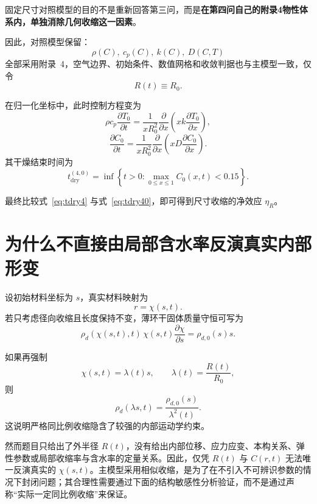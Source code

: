 \documentclass[UTF8,a4paper,12pt]{ctexart}
\begin{document}
固定尺寸对照模型的目的不是重新回答第三问，而是\textbf{在第四问自己的附录4物性体系内，单独消除几何收缩这一因素}。

因此，对照模型保留：
\[
\rho(C),\ c_p(C),\ k(C),\ D(C,T)
\]
全部采用附录~4，空气边界、初始条件、数值网格和收敛判据也与主模型一致，仅令
\begin{equation}
R(t)\equiv R_0.
\label{eq:Rfixed}
\end{equation}

在归一化坐标中，此时控制方程变为
\begin{equation}
\rho c_p\frac{\partial T_0}{\partial t}
=
\frac{1}{xR_0^2}
\frac{\partial}{\partial x}
\left(
 xk\frac{\partial T_0}{\partial x}
\right),
\end{equation}
\begin{equation}
\frac{\partial C_0}{\partial t}
=
\frac{1}{xR_0^2}
\frac{\partial}{\partial x}
\left(
 xD\frac{\partial C_0}{\partial x}
\right).
\end{equation}
其干燥结束时间为
\begin{equation}
\boxed{
t_{\mathrm{dry}}^{(4,0)}
=
\inf\left\{
t>0:
\max_{0\le x\le1}C_0(x,t)<0.15
\right\}.
}
\label{eq:tdry40}
\end{equation}

最终比较式~\eqref{eq:tdry4} 与式~\eqref{eq:tdry40}，即可得到尺寸收缩的净效应 $\eta_R$。

\section{为什么不直接由局部含水率反演真实内部形变}

设初始材料坐标为 $s$，真实材料映射为
\[
r=\chi(s,t).
\]
若只考虑径向收缩且长度保持不变，薄环干固体质量守恒可写为
\begin{equation}
\rho_d(\chi(s,t),t)
\,\chi(s,t)
\frac{\partial\chi}{\partial s}
=
\rho_{d,0}(s)s.
\label{eq:drymass}
\end{equation}

如果再强制
\[
\chi(s,t)=\lambda(t)s,
\qquad
\lambda(t)=\frac{R(t)}{R_0},
\]
则
\begin{equation}
\rho_d(\lambda s,t)
=
\frac{\rho_{d,0}(s)}{\lambda^2(t)}.
\label{eq:rhodsimilar}
\end{equation}
这说明严格同比例收缩隐含了较强的内部运动学约束。

然而题目只给出了外半径 $R(t)$，没有给出内部位移、应力应变、本构关系、弹性参数或局部收缩率与含水率的定量关系。因此，仅凭 $R(t)$ 与 $C(r,t)$ 无法唯一反演真实的 $\chi(s,t)$。主模型采用相似收缩，是为了在不引入不可辨识参数的情况下封闭问题；其合理性需要通过下面的结构敏感性分析验证，而不是通过声称“实际一定同比例收缩”来保证。
\end{document}
